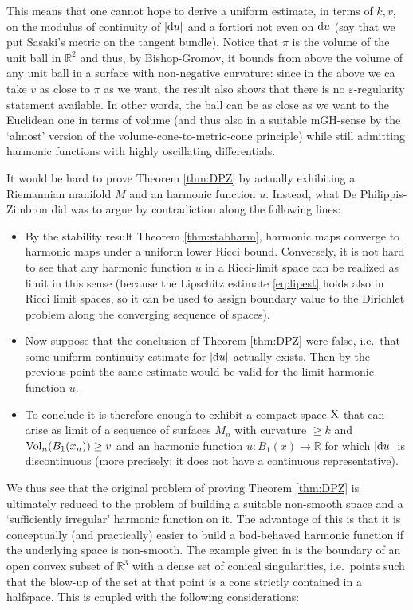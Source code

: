 \documentclass[11pt]{article}
\numberwithin{equation}{section}
\newcommand{\R}{\mathbb{R}}
\newcommand{\X}{{\rm X}}
\renewcommand{\d}{{\rm d}}
\newcommand{\eps}{\varepsilon}
\begin{document}
This means that  one cannot hope to derive a uniform estimate, in terms of $k,v$, on the modulus of continuity of $|\d u|$ and a fortiori not even on $\d u$ (say that we put Sasaki's metric on the tangent bundle).  Notice that $\pi$ is the volume of the unit ball in $\R^2$ and thus, by Bishop-Gromov, it bounds from above the volume of any unit ball in a surface with non-negative curvature: since in the above we ca take $v$ as close to $\pi$ as we want, the result also shows that there is no $\eps$-regularity statement available. In other words, the ball can be as close as we want to the Euclidean one in terms of volume (and thus  also in a suitable mGH-sense by the `almost' version of the volume-cone-to-metric-cone principle) while still admitting harmonic functions with highly oscillating differentials.

It would be hard to prove Theorem \ref{thm:DPZ} by actually exhibiting a Riemannian manifold $M$ and an harmonic function $u$. Instead, what De Philippis-Zimbron did was to argue by contradiction along the following lines:
\begin{itemize}
\item[i)] By the stability result Theorem \ref{thm:stabharm}, harmonic maps converge to harmonic maps under a uniform lower Ricci bound. Conversely, it is not hard to see that any harmonic function $u$ in a Ricci-limit space can be realized as limit in this sense (because the Lipschitz estimate \eqref{eq:lipest} holds also in Ricci limit spaces, so it can be used  to assign boundary value to the Dirichlet problem along the converging sequence of spaces).
\item[ii)] Now suppose that the conclusion of Theorem \ref{thm:DPZ} were false, i.e.\ that some uniform continuity estimate for $|\d u|$ actually exists. Then by the previous point the same estimate would be valid for the limit harmonic function $u$.
\item[iii)] To conclude it is therefore enough to exhibit a compact space $\X$ that can arise as limit of a sequence of surfaces $M_n $ with curvature $\geq k$ and ${\rm Vol}_n(B_1(x_n))\geq v$ and an harmonic function $u:B_1(x)\to\R$ for which $|\d u|$ is discontinuous (more precisely: it does not have a continuous representative).
\end{itemize}
We thus see that the original problem of proving Theorem \ref{thm:DPZ} is ultimately reduced to the problem of building a suitable non-smooth space and a `sufficiently irregular' harmonic function on it. The advantage of this is that it is conceptually (and practically) easier to build  a bad-behaved harmonic function if the underlying space is non-smooth. The example given in \cite{DPZ19} is the boundary of an open convex subset of $\R^3$ with a dense set of conical singularities, i.e.\ points such that the blow-up of the set at that point is a cone strictly contained in a halfspace. This is coupled with the following considerations:
\end{document}
